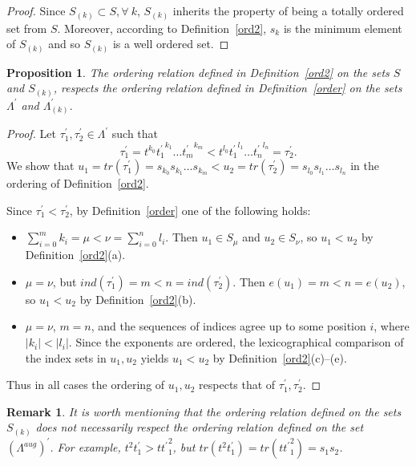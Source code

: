 \documentclass[11pt]{amsart}
\newtheorem{prop}{Proposition}
\newtheorem{remark}{Remark}
\begin{document}
\begin{proof}
Since $S_{(k)} \subset S, \forall\ k$, $S_{(k)}$ inherits the property of being a totally ordered set from $S$. Moreover, according to Definition~\ref{ord2}, $s_k$ is the minimum element of $S_{(k)}$ and so $S_{(k)}$ is a well ordered set.
\end{proof}


\begin{prop}\label{resp}
The ordering relation defined in Definition~\ref{ord2} on the sets $S$ and $S_{(k)}$, respects the ordering relation defined in Definition~\ref{order} on the sets $\Lambda^{\prime}$ and $\Lambda^{\prime}_{(k)}$.
\end{prop}

\begin{proof}
Let $\tau_1^{\prime}, \tau_2^{\prime} \in \Lambda^{\prime}$ such that
\[
\tau_1^{\prime}= t^{k_0}{t_1^{\prime}}^{k_1} \ldots {t_m^{\prime}}^{k_m} < t^{l_0}{t_1^{\prime}}^{l_1} \ldots {t_n^{\prime}}^{l_n}=\tau_2^{\prime}.
\]
We show that $u_1=tr(\tau_1^{\prime})=s_{k_0}s_{k_1} \ldots s_{k_m} < u_2=tr(\tau_2^{\prime})=s_{l_0}s_{l_1} \ldots s_{l_n}$ in the ordering of Definition~\ref{ord2}.

Since $\tau_1^{\prime} < \tau_2^{\prime}$, by Definition~\ref{order} one of the following holds:
\begin{itemize}
\item[i.] $\sum_{i=0}^{m}k_i =\mu < \nu = \sum_{i=0}^{n}l_i$. Then $u_1\in S_\mu$ and $u_2\in S_\nu$, so $u_1<u_2$ by Definition~\ref{ord2}(a).
\smallskip

\item[ii.] $\mu = \nu$, but $ind(\tau_1^{\prime})=m< n=ind(\tau_2^{\prime})$. Then $e(u_1)=m < n=e(u_2)$, so $u_1<u_2$ by Definition~\ref{ord2}(b).
\smallskip

\item[iii.] $\mu=\nu$, $m=n$, and the sequences of indices agree up to some position $i$, where $|k_i|<|l_i|$. Since the exponents are ordered, the lexicographical comparison of the index sets in $u_1,u_2$ yields $u_1<u_2$ by Definition~\ref{ord2}(c)–(e).
\end{itemize}

Thus in all cases the ordering of $u_1,u_2$ respects that of $\tau_1^{\prime},\tau_2^{\prime}$.
\end{proof}



\begin{remark}\rm
It is worth mentioning that the ordering relation defined on the sets $S_{(k)}$ does not necessarily respect the ordering relation defined on the set $({\Lambda}^{aug})^{\prime}$. For example, $t^2t^{\prime}_1 > t{t^{\prime}}^2_1$, but $tr(t^2t^{\prime}_1) = tr(t{t^{\prime}}^2_1) =s_1s_2$.
\end{remark}
\end{document}
